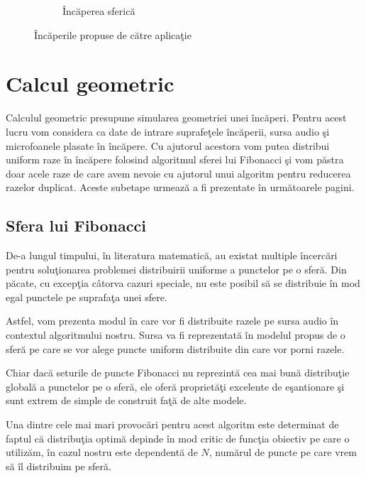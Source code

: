 \begin{figure}[!htb]
\begin{subfigure}[b]{.3\textwidth}
			\caption{\^{I}nc\u{a}perea sferic\u{a}}
		\end{subfigure}
		
		\caption{\^{I}nc\u{a}perile propuse de c\u{a}tre aplica\c{t}ie}
		\label{rooms}
	\end{figure}
	

\section{Calcul geometric}

	Calculul geometric presupune simularea geometriei unei \^{i}nc\u{a}peri. Pentru acest lucru vom considera ca date de intrare suprafe\c{t}ele \^{i}nc\u{a}perii, sursa audio \c{s}i microfoanele plasate \^{i}n \^{i}nc\u{a}pere. Cu ajutorul acestora vom putea distribui uniform raze \^{i}n \^{i}nc\u{a}pere folosind algoritmul sferei lui Fibonacci \c{s}i vom p\u{a}stra doar acele raze de care avem nevoie cu ajutorul unui algoritm pentru reducerea razelor duplicat. Aceste subetape urmeaz\u{a} a fi prezentate \^{i}n urm\u{a}toarele pagini.
	
\subsection{Sfera lui Fibonacci}

	De-a lungul timpului, \^{i}n literatura matematic\u{a}, au existat multiple \^{i}ncerc\u{a}ri pentru solu\c{t}ionarea problemei distribuirii uniforme a punctelor pe o sfer\u{a}. Din p\u{a}cate, cu excep\c{t}ia c\^{a}torva cazuri speciale, nu este posibil s\u{a} se distribuie \^{i}n mod egal punctele pe suprafa\c{t}a unei sfere.
	\bigskip

	Astfel, vom prezenta modul \^{i}n care vor fi distribuite razele pe sursa audio \^{i}n contextul algoritmului nostru. Sursa va fi reprezentat\u{a} \^{i}n modelul propus de o sfer\u{a} pe care se vor alege puncte uniform distribuite din care vor porni razele.
	\bigskip
	
	Chiar dac\u{a} seturile de puncte Fibonacci nu reprezint\u{a} cea mai bun\u{a} distribu\c{t}ie global\u{a} a punctelor pe o sfer\u{a}, ele ofer\u{a} propriet\u{a}\c{t}i excelente de e\c{s}antionare \c{s}i sunt extrem de simple de construit fa\c{t}\u{a} de alte modele.
	\bigskip
	
	Una dintre cele mai mari provoc\u{a}ri pentru acest algoritm este determinat de faptul c\u{a} distribu\c{t}ia optim\u{a} depinde \^{i}n mod critic de func\c{t}ia obiectiv pe care o utiliz\u{a}m, \^{i}n cazul nostru este dependent\u{a} de $N$, num\u{a}rul de puncte pe care vrem s\u{a} \^{i}l distribuim pe sfer\u{a}.
	\bigskip
	
